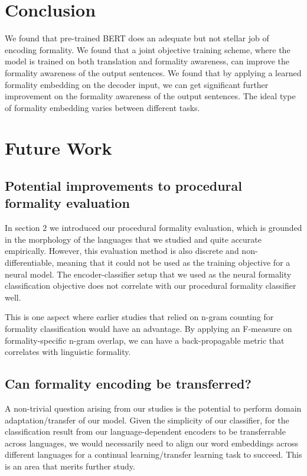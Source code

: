 \documentclass[11pt]{article}
\begin{document}
\section{Conclusion}

We found that pre-trained BERT does an adequate but not stellar job of encoding formality. We found that a joint objective training scheme, where the model is trained on both translation and formality awareness, can improve the formality awareness of the output sentences. We found that by applying a learned formality embedding on the decoder input, we can get significant further improvement on the formality awareness of the output sentences. The ideal type of formality embedding varies between different tasks.

\section{Future Work}

\subsection{Potential improvements to procedural formality evaluation}

In section $2$ we introduced our procedural formality evaluation, which is grounded in the morphology of the languages that we studied and quite accurate empirically. However, this evaluation method is also discrete and non-differentiable, meaning that it could not be used as the training objective for a neural model. The encoder-classifier setup that we used as the neural formality classification objective does not correlate with our procedural formality classifier well. 

This is one aspect where earlier studies that relied on n-gram counting for formality classification would have an advantage. By applying an F-measure on formality-specific n-gram overlap, we can have a back-propagable metric that correlates with linguistic formality.

\subsection{Can formality encoding be transferred?}

A non-trivial question arising from our studies is the potential to perform domain adaptation/transfer of our model. Given the simplicity of our classifier, for the classification result from our language-dependent encoders to be transferrable across languages, we would necessarily need to align our word embeddings across different languages for a continual learning/transfer learning task to succeed. This is an area that merits further study.
\end{document}
